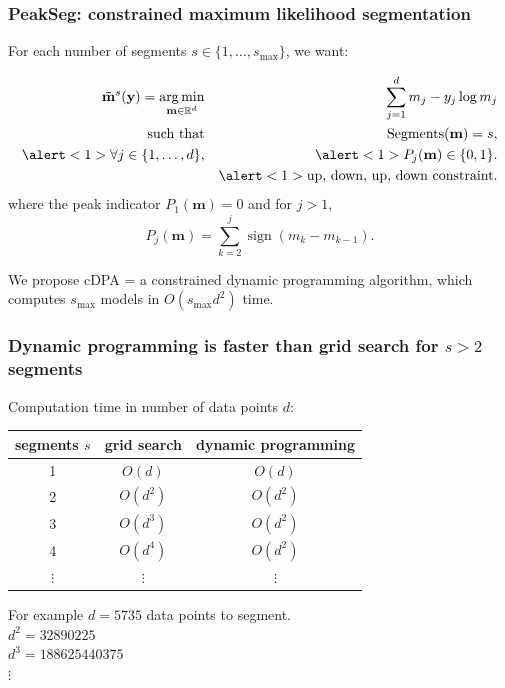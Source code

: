 \documentclass{beamer}
\DeclareMathOperator*{\argmin}{arg\,min}
\DeclareMathOperator*{\Lik}{Lik}
\DeclareMathOperator*{\Segments}{Segments}
\newcommand{\sign}{\operatorname{sign}}
\newcommand{\RR}{\mathbb R}
\begin{document}
\begin{frame}[fragile]
  \frametitle{PeakSeg:  constrained maximum likelihood
    segmentation}
For each number of segments $s\in\{1, \dots,
  s_{\text{max}}\}$, we want:

  \begin{eqnarray*}
  \label{PeakSeg}
  \mathbf{\tilde m}^s(\mathbf y)  =
    \argmin_{\mathbf m\in\RR^{d}}& &\ \ 
\sum_{j=1}^d
      m_j - y_j \log m_j
\\
    \text{such that}& &\ \  \Segments(\mathbf m)=s,  \\
    \alert<1>{\forall j\in\{1, \dots, d\},} & &
    \ \ \alert<1>{P_j(\mathbf m) \in\{0, 1\}.}\\
    && \alert<1>{\text{up, down, up, down constraint.}}
   \end{eqnarray*}
where the peak indicator $P_1(\mathbf m)=0$ and for $j>1$,
\begin{equation*}
  \label{eq:peaks}
  P_j(\mathbf m) = \sum_{k=2}^j \sign( m_{k} - m_{k-1} ).
\end{equation*}

We propose cDPA = a constrained dynamic programming algorithm, which
computes $s_{\text{max}}$ models in $O(s_{\text{max}} d^2)$ time.

\end{frame}








\begin{frame}
  \frametitle{Dynamic programming is faster than grid search for $s>
    2$ segments}

  Computation time in number of data points $d$:

  \vskip 1cm

  \begin{tabular}{ccc}
    segments $s$ & grid search & dynamic programming \\
    \hline
    1 & $O(d)$ & $O(d)$ \\
    2 & $O(d^2)$ & $O(d^2)$ \\
    3 & $O(d^3)$ & $O(d^2)$ \\
    4 & $O(d^4)$ & $O(d^2)$ \\
    $\vdots$ &     $\vdots$ &     $\vdots$ 
  \end{tabular}

  \vskip 1cm

  For example $d = 5735$ data points to segment.\\
  $d^2 = 32890225$\\
  $d^3 = 188625440375$\\
  $\vdots$
\end{frame}
\end{document}
